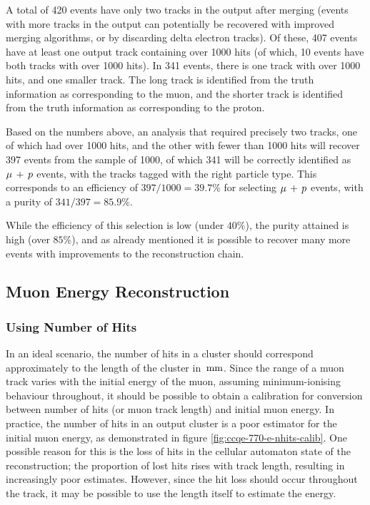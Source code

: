 A total of 420 events have only two tracks in the output after merging (events with more tracks in the output can potentially be recovered with improved merging algorithms, or by discarding delta electron tracks). Of these, 407 events have at least one output track containing over 1000 hits (of which, 10 events have both tracks with over 1000 hits). In 341 events, there is one track with over 1000 hits, and one smaller track. The long track is identified from the truth information as corresponding to the muon, and the shorter track is identified from the truth information as corresponding to the proton.

Based on the numbers above, an analysis that required precisely two tracks, one of which had over 1000 hits, and the other with fewer than 1000 hits will recover 397 events from the sample of 1000, of which 341 will be correctly identified as $\mu\,+\,p$ events, with the tracks tagged with the right particle type. This corresponds to an efficiency of $397/1000 = 39.7\%$ for selecting $\mu\,+\,p$ events, with a purity of $341/397 = 85.9\%$.

While the efficiency of this selection is low (under $40\%$), the purity attained is high (over $85\%$), and as already mentioned it is possible to recover many more events with improvements to the reconstruction chain.

\subsection{Muon Energy Reconstruction}
\subsubsection{Using Number of Hits}
In an ideal scenario, the number of hits in a cluster should correspond approximately to the length of the cluster in $\,\mathrm{mm}$. Since the range of a muon track varies with the initial energy of the muon, assuming minimum-ionising behaviour throughout, it should be possible to obtain a calibration for conversion between number of hits (or muon track length) and initial muon energy. In practice, the number of hits in an output cluster is a poor estimator for the initial muon energy, as demonstrated in figure \ref{fig:ccqe-770-e-nhits-calib}. One possible reason for this is the loss of hits in the cellular automaton state of the reconstruction; the proportion of lost hits rises with track length, resulting in increasingly poor estimates. However, since the hit loss should occur throughout the track, it may be possible to use the length itself to estimate the energy.

